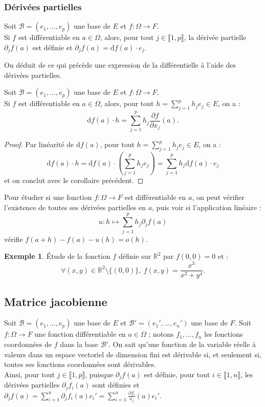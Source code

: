 \documentclass[french]{article}
\newcommand{\R}{\mathbb{R}}
\renewcommand{\d}{\text{d}}
\theoremstyle{plain}
\theoremstyle{definition}
\newtheorem*{ex}{Exemple}
\theoremstyle{remark}
\begin{document}
\subsubsection*{Dérivées partielles}

\begin{cor}%
	Soit $\mathcal{B}=(e_1,\ldots,e_p)$ une base de $E$ et $f:\Omega\to F$.\\
	Si $f$ est différentiable en $a\in\Omega$, alors, pour tout $j\in\llbracket1,p\rrbracket$, la dérivée partielle $\partial_jf(a)$ est définie et $\partial_jf(a)=\d f(a)\cdot e_j$.
\end{cor}

On déduit de ce qui précède une expression de la différentielle à l'aide des dérivées partielles.

\begin{cor}%
	Soit $\mathcal{B}=(e_1,\ldots,e_p)$ une base de $E$ et $f:\Omega\to F$.\\ Si $f$ est différentiable en $a\in\Omega$,  alors, pour tout $h=\displaystyle\sum_{j=1}^{p}h_je_j\in E$, on a :
	$$\d f(a)\cdot h=\sum_{j=1}^{p}h_j\frac{\partial f}{\partial x_j}(a).$$
\end{cor}
\begin{proof}
	Par linéarité de $\d f(a)$, pour tout $h=\displaystyle\sum_{j=1}^{p}h_je_j\in E$, on a :
	$$\d f(a)\cdot h=\d f(a)\cdot\left(\sum_{j=1}^{p}h_je_j\right)=\sum_{j=1}^{p}h_j\d f(a)\cdot e_j$$ et on conclut avec le corollaire précédent.
\end{proof}

\begin{met}
	Pour étudier si une fonction $f:\Omega\to F$ est différentiable en $a$, on peut vérifier l'existence de toutes ses dérivées partielles en $a$, puis voir si l'application linéaire : $$u:h\mapsto\sum_{j=1}^{p}h_j\partial_jf(a)$$ vérifie $f(a+h)-f(a)-u(h)=o(h)$.
\end{met}

\begin{ex}
	Étude de la fonction $f$ définie sur $\R^2$ par $f(0,0)=0$ et :
	$$\forall (x,y)\in\R^2\setminus\{(0,0)\},\ f(x,y)=\frac{x^3}{x^2+y^4}.$$
\end{ex}

\subsection{Matrice jacobienne}

Soit $\mathcal{B}=(e_1,\ldots,e_p)$ une base de $E$ et $\mathcal{B}'=(e_1',\ldots,e_n')$ une base de $F$. Soit $f:\Omega\to F$ une fonction différentiable en $a\in\Omega$ ; notons $f_1,\ldots,f_n$ les fonctions coordonnées de $f$ dans la base $\mathcal{B}'$. On sait qu'une fonction de la variable réelle à valeurs dans un espace vectoriel de dimension fini est dérivable si, et seulement si, toutes ses fonctions coordonnées sont dérivables.\\
Ainsi, pour tout $j\in\llbracket1,p\rrbracket$, puisque $\partial_jf(a)$ est définie, pour tout $i\in\llbracket1,n\rrbracket$, les dérivées partielles $\partial_jf_i(a)$ sont définies et $\partial_jf(a)=\displaystyle\sum_{i=1}^{n}\partial_jf_i(a)e_i'=\sum_{i=1}^{n}\frac{\partial f_i}{x_j}(a)e_i'$.
\end{document}
